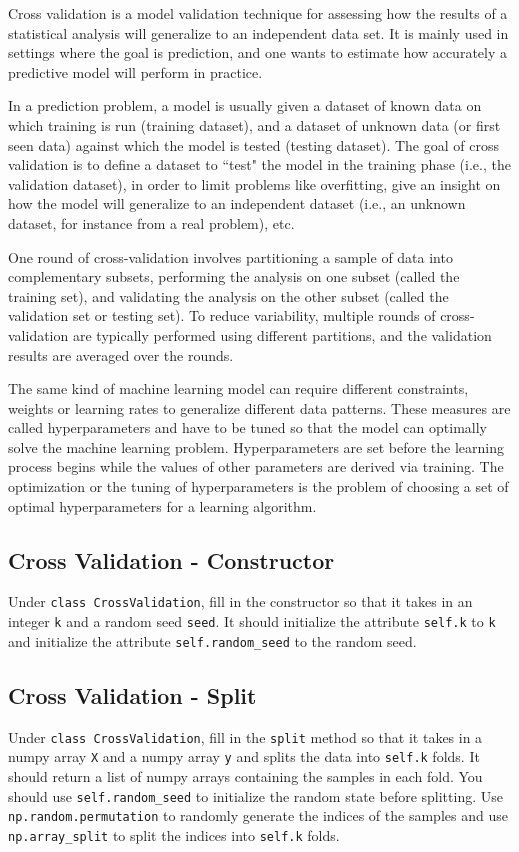 \documentclass{article}
\begin{document}
Cross validation is a model validation technique for assessing how the results of a statistical analysis will generalize to an independent data set. It is mainly used in settings where the goal is prediction, and one wants to estimate how accurately a predictive model will perform in practice.

In a prediction problem, a model is usually given a dataset of known data on which training is run (training dataset), and a dataset of unknown data (or first seen data) against which the model is tested (testing dataset). The goal of cross validation is to define a dataset to ``test" the model in the training phase (i.e., the validation dataset), in order to limit problems like overfitting, give an insight on how the model will generalize to an independent dataset (i.e., an unknown dataset, for instance from a real problem), etc.

One round of cross-validation involves partitioning a sample of data into complementary subsets, performing the analysis on one subset (called the training set), and validating the analysis on the other subset (called the validation set or testing set). To reduce variability, multiple rounds of cross-validation are typically performed using different partitions, and the validation results are averaged over the rounds.

The same kind of machine learning model can require different constraints, weights or learning rates to generalize different data patterns. These measures are called hyperparameters and have to be tuned so that the model can optimally solve the machine learning problem. Hyperparameters are set before the learning process begins while the values of other parameters are derived via training. The optimization or the tuning of hyperparameters is the problem of choosing a set of optimal hyperparameters for a learning algorithm.

\subsection{ Cross Validation - Constructor}
Under \verb|class CrossValidation|, fill in the constructor so that it takes in an integer \verb|k| and a random seed \verb|seed|. It should initialize the attribute \verb|self.k| to \verb|k| and initialize the attribute \verb|self.random_seed| to the random seed.

\subsection{  Cross Validation - Split}
Under \verb|class CrossValidation|, fill in the \verb|split| method so that it takes in a numpy array \verb|X| and a numpy array \verb|y| and splits the data into \verb|self.k| folds. It should return a list of numpy arrays containing the samples in each fold. You should use \verb|self.random_seed| to initialize the random state before splitting. Use \verb|np.random.permutation| to randomly generate the indices of the samples and use \verb|np.array_split| to split the indices into \verb|self.k| folds.
\end{document}

